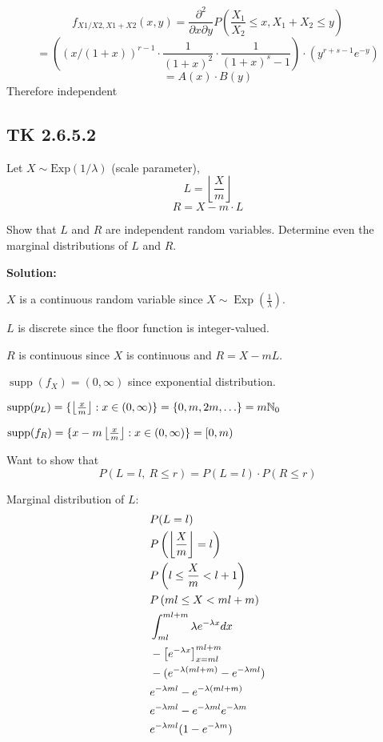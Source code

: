 \documentclass{article}
\begin{document}
\[f_{X1/X2,X1+X2}(x,y) = \frac{\partial^2}{\partial x\partial y}P(\frac{X_1}{X_2}\leq x, X_1+X_2 \leq y)\]
\[ = ((x/(1+x))^{r-1} \cdot \frac{1}{(1+x)^2} \cdot \frac{1}{(1+x)^s-1}) \cdot (y^{r+s-1}e^{-y})\]
\[ = A(x) \cdot B(y)\]
Therefore independent

\subsection{TK 2.6.5.2}

Let \( X \sim \text{Exp}(1/\lambda) \) (scale parameter),
\[ L = \left\lfloor \frac{X}{m} \right\rfloor \]
\[ R = X - m \cdot L \]

Show that \(L\) and \(R\) are independent random variables.
Determine even the marginal distributions of \( L \) and \( R \).

\textbf{Solution:}

\(X\) is a continuous random variable since \(X\sim \operatorname{Exp}(\frac{1}{\lambda})\).

\(L\) is discrete since the floor function is integer-valued.

\(R\) is continuous since \(X\) is continuous and \(R=X-mL\).

\(\operatorname{supp}(f_X) = (0,\infty)\) since exponential distribution.

\(\operatorname{supp}(p_L) = \{\left\lfloor\frac{x}{m}\right\rfloor : x \in (0,\infty)\} = \{0,m,2m,\ldots\} = m\mathbb{N}_0\)

\(\operatorname{supp}(f_R) = \{x-m \left\lfloor\frac{x}{m}\right\rfloor : x \in (0,\infty)\} = [0,m)\)

Want to show that
\[P(L=l,\ R\leq r) = P(L=l)\cdot P(R\leq r)\]

Marginal distribution of \(L\):
\begin{align*}
    & P(L=l) \\
    & P\left(\left\lfloor\frac{X}{m}\right\rfloor=l\right) \\
    & P\left(l\leq \frac{X}{m} < l+1\right) \\
    & P\left(ml\leq X < ml+m\right) \\
    & \int_{ml}^{ml+m}\lambda e^{-\lambda x}dx \\
    & -\left[e^{-\lambda x}\right]_{x=ml}^{ml+m} \\
    & -(e^{-\lambda (ml+m)} - e^{-\lambda ml}) \\
    & e^{-\lambda ml} - e^{-\lambda (ml+m)} \\
    & e^{-\lambda ml} - e^{-\lambda ml}e^{-\lambda m} \\
    & e^{-\lambda ml} (1 - e^{-\lambda m})
\end{align*}
\end{document}
